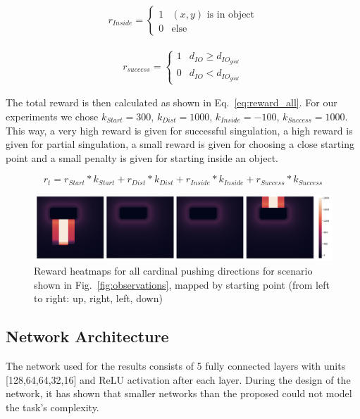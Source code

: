 \documentclass{article}
\newcommand{\myeqref}[1]{Eq.~\ref{#1}}
\newcommand{\myfigref}[1]{Fig.~\ref{#1}}
\begin{document}
\begin{minipage}[b]{0.49\textwidth}
\begin{align}
r_{Inside} = \begin{cases}
1 & (x,y) \text{ is in object} \\
0 & \text{else}
\end{cases}
\end{align}
\end{minipage}
\begin{minipage}[b]{0.49\textwidth}
\begin{align}
r_{success} = \begin{cases}
1 & d_{IO}\geq d_{IO_{goal}} \\
0 & d_{IO}< d_{IO_{goal}} 
\end{cases}
\end{align}
\end{minipage}

The total reward is then calculated as shown in \myeqref{eq:reward_all}. For our experiments we chose $k_{Start}=300$, $k_{Dist}=1000$, $k_{Inside}=-100$, $k_{Success}=1000$. This way, a very high reward is given for successful singulation, a high reward is given for partial singulation, a small reward is given for choosing a close starting point and a small penalty is given for starting inside an object.

\begin{equation}
r_t = r_{Start}*k_{Start} + r_{Dist}*k_{Dist} + r_{Inside}*k_{Inside} + r_{Success}*k_{Success} 
\label{eq:reward_all}
\end{equation}

\begin{figure}[!ht]
\centering
\includegraphics[width=14cm]{figures/rewards.png}
\caption{Reward heatmaps for all cardinal pushing directions for scenario shown in \myfigref{fig:observations}, 
mapped by starting point (from left to right: up, right, left, down)
}
\label{fig:rewards}
\end{figure}

\subsection{Network Architecture}
The network used for the results consists of 5 fully connected layers with units [128,64,64,32,16] and ReLU activation after each layer. During the design of the network, it has shown that smaller networks than the proposed could not model the task's complexity.
\end{document}
